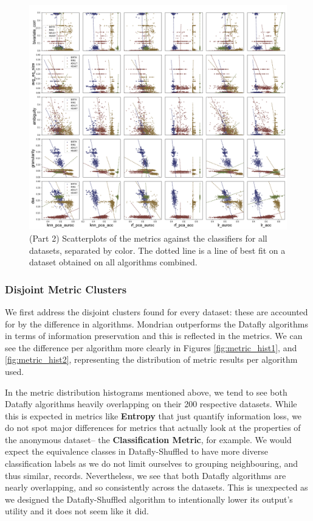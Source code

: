 \begin{figure}
    \centerfloat
    \includegraphics[width=1.2\textwidth]{project/fig/metrics-vs-accs_2.png}
    \caption{(Part 2) Scatterplots of the metrics against the classifiers for all datasets, separated by color. The dotted line is a line of best fit on a dataset obtained on all algorithms combined.}
    \label{fig:metrics_scatter2}
\end{figure}

\subsubsection{Disjoint Metric Clusters}
We first address the disjoint clusters found for every dataset: these are accounted for by the difference in algorithms. Mondrian outperforms the Datafly algorithms in terms of information preservation and this is reflected in the metrics. We can see the difference per algorithm more clearly in Figures \ref{fig:metric_hist1}, and \ref{fig:metric_hist2},  representing the distribution of metric results per algorithm used. 

In the metric distribution histograms mentioned above, we tend to see both Datafly algorithms heavily overlapping on their 200 respective datasets. While this is expected in metrics like \textbf{Entropy} that just quantify information loss, we do not spot major differences for metrics that actually look at the properties of the anonymous dataset-- the \textbf{Classification Metric}, for example. We would expect the equivalence classes in Datafly-Shuffled to have more diverse classification labels as we do not limit ourselves to grouping neighbouring, and thus similar, records. Nevertheless, we see that both Datafly algorithms are nearly overlapping, and so consistently across the datasets. This is unexpected as we designed the Datafly-Shuffled algorithm to intentionally lower its output's utility and it does not seem like it did.


